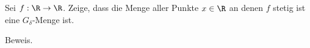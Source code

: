 \begin{exercise}
Sei $f: \R \rightarrow \R$. Zeige, dass die Menge aller Punkte $x \in \R$ an
denen $f$ stetig ist eine $G_{\delta}$-Menge ist.
\end{exercise}
\begin{solution}
Beweis.
\end{solution}
